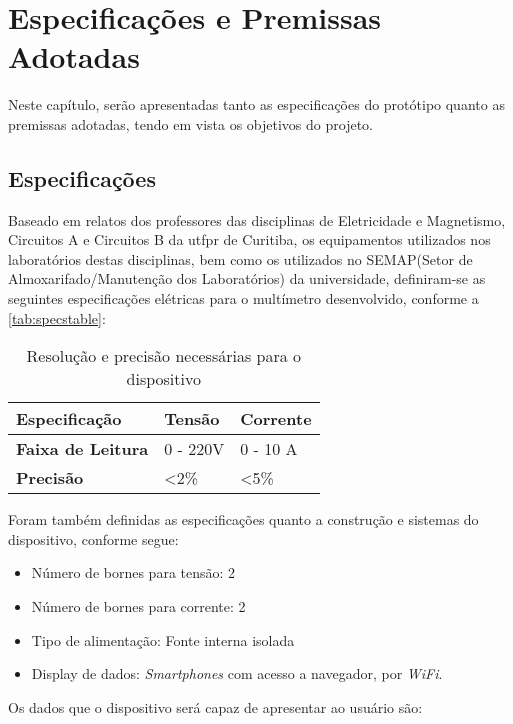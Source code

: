 \chapter{Especificações e Premissas Adotadas}\label{cap:especificacoes}

Neste capítulo, serão apresentadas tanto as especificações do protótipo quanto as premissas adotadas, tendo em vista os objetivos do projeto.

\section{Especificações}\label{spec}
Baseado em relatos dos professores das disciplinas de Eletricidade e Magnetismo, Circuitos A e Circuitos B da \gls{utfpr} de Curitiba, os equipamentos utilizados nos laboratórios destas disciplinas, bem como os utilizados no \gls{SEMAP}(Setor de Almoxarifado/Manutenção dos Laboratórios) da universidade, definiram-se as seguintes especificações elétricas para o multímetro desenvolvido, conforme a \autoref{tab:specstable}:

\begin{table}[!ht]
    \centering
    \caption{Resolução e precisão necessárias para o dispositivo}
    \label{tab:specstable}
    \begin{tabular}{|l|l|l|}
        \hline
        \textbf{Especificação}    & \textbf{Tensão} & \textbf{Corrente} \\ \hline
        \textbf{Faixa de Leitura} & 0 - 220V        & 0 - 10 A          \\ \hline
        \textbf{Precisão}         & <2\%            & <5\%              \\ \hline
    \end{tabular}
\end{table}

Foram também definidas as especificações quanto a construção e sistemas do dispositivo, conforme segue:

\begin{itemize}
    \item Número de bornes para tensão: 2
    \item Número de bornes para corrente: 2
    \item Tipo de alimentação: Fonte interna isolada
    \item Display de dados: \textit{Smartphones} com acesso a navegador, por \textit{WiFi}.
\end{itemize}

Os dados que o dispositivo será capaz de apresentar ao usuário são:

